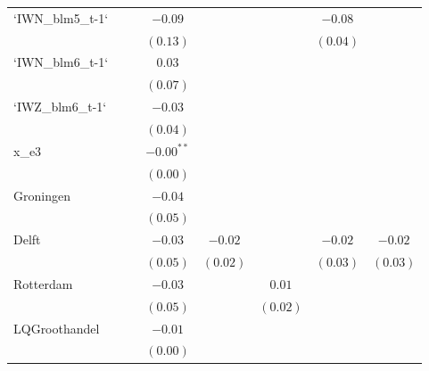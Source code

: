 \begin{center}
\begin{longtable}{l c c c c c c c }
`IWN\_blm5\_t-1` &               &             & $-0.09$      &               &               & $-0.08$       &               \\
                 &               &             & $(0.13)$     &               &               & $(0.04)$      &               \\
`IWN\_blm6\_t-1` &               &             & $0.03$       &               &               &               &               \\
                 &               &             & $(0.07)$     &               &               &               &               \\
`IWZ\_blm6\_t-1` &               &             & $-0.03$      &               &               &               &               \\
                 &               &             & $(0.04)$     &               &               &               &               \\
x\_e3            &               &             & $-0.00^{**}$ &               &               &               &               \\
                 &               &             & $(0.00)$     &               &               &               &               \\
Groningen        &               &             & $-0.04$      &               &               &               &               \\
                 &               &             & $(0.05)$     &               &               &               &               \\
Delft            &               &             & $-0.03$      & $-0.02$       &               & $-0.02$       & $-0.02$       \\
                 &               &             & $(0.05)$     & $(0.02)$      &               & $(0.03)$      & $(0.03)$      \\
Rotterdam        &               &             & $-0.03$      &               & $0.01$        &               &               \\
                 &               &             & $(0.05)$     &               & $(0.02)$      &               &               \\
LQGroothandel    &               &             & $-0.01$      &               &               &               &               \\
                 &               &             & $(0.00)$     &               &               &               &               \\

\end{longtable}
\end{center}
